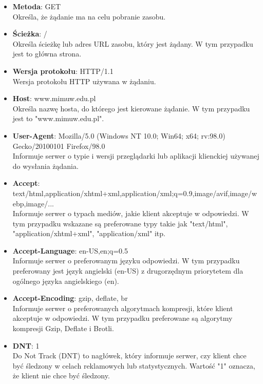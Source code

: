 \begin{itemize}[label=--]
  \item \textbf{Metoda}: GET \\
  Określa, że żądanie ma na celu pobranie zasobu.
  
  \item \textbf{Ścieżka}: / \\
  Określa ścieżkę lub adres URL zasobu, który jest żądany. W tym przypadku jest to główna strona.
  
  \item \textbf{Wersja protokołu}: HTTP/1.1 \\
  Wersja protokołu HTTP używana w żądaniu.
  
  \item \textbf{Host}: www.mimuw.edu.pl \\
  Określa nazwę hosta, do którego jest kierowane żądanie. W tym przypadku jest to "www.mimuw.edu.pl".
  
  \item \textbf{User-Agent}: Mozilla/5.0 (Windows NT 10.0; Win64; x64; rv:98.0) Gecko/20100101 Firefox/98.0 \\
  Informuje serwer o typie i wersji przeglądarki lub aplikacji klienckiej używanej do wysłania żądania.
  
  \item \textbf{Accept}: text/html,application/xhtml+xml,application/xml;q=0.9,image/avif,image/webp,image/... \\
  Informuje serwer o typach mediów, jakie klient akceptuje w odpowiedzi. W tym przypadku wskazane są preferowane typy takie jak "text/html", "application/xhtml+xml", "application/xml" itp.
  
  \item \textbf{Accept-Language}: en-US,en;q=0.5 \\
  Informuje serwer o preferowanym języku odpowiedzi. W tym przypadku preferowany jest język angielski (en-US) z drugorzędnym priorytetem dla ogólnego języka angielskiego (en).
  
  \item \textbf{Accept-Encoding}: gzip, deflate, br \\
  Informuje serwer o preferowanych algorytmach kompresji, które klient akceptuje w odpowiedzi. W tym przypadku preferowane są algorytmy kompresji Gzip, Deflate i Brotli.
  
  \item \textbf{DNT}: 1 \\
  Do Not Track (DNT) to nagłówek, który informuje serwer, czy klient chce być śledzony w celach reklamowych lub statystycznych. Wartość "1" oznacza, że klient nie chce być śledzony.
  

\end{itemize}
